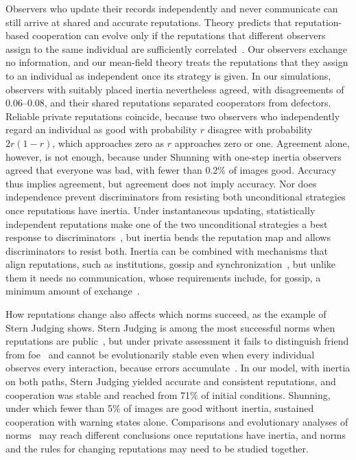 \documentclass[10pt]{wlscirep}
\theoremstyle{plain}
\theoremstyle{remark}
\begin{document}
Observers who update their records independently and never communicate can still arrive at shared and accurate reputations. Theory predicts that reputation-based cooperation can evolve only if the reputations that different observers assign to the same individual are sufficiently correlated~\cite{murase2024synchronization,tham2026}. Our observers exchange no information, and our mean-field theory treats the reputations that they assign to an individual as independent once its strategy is given. In our simulations, observers with suitably placed inertia nevertheless agreed, with disagreements of 0.06--0.08, and their shared reputations separated cooperators from defectors. Reliable private reputations coincide, because two observers who independently regard an individual as good with probability $r$ disagree with probability $2r(1-r)$, which approaches zero as $r$ approaches zero or one. Agreement alone, however, is not enough, because under Shunning with one-step inertia observers agreed that everyone was bad, with fewer than 0.2\% of images good. Accuracy thus implies agreement, but agreement does not imply accuracy. Nor does independence prevent discriminators from resisting both unconditional strategies once reputations have inertia. Under instantaneous updating, statistically independent reputations make one of the two unconditional strategies a best response to discriminators~\cite{murase2024synchronization}, but inertia bends the reputation map and allows discriminators to resist both. Inertia can be combined with mechanisms that align reputations, such as institutions, gossip and synchronization~\cite{radzvilavicius2021,kawakatsu2024,murase2024synchronization}, but unlike them it needs no communication, whose requirements include, for gossip, a minimum amount of exchange~\cite{kawakatsu2024}.

How reputations change also affects which norms succeed, as the example of Stern Judging shows. Stern Judging is among the most successful norms when reputations are public~\cite{santos2018}, but under private assessment it fails to distinguish friend from foe~\cite{hilbe2018} and cannot be evolutionarily stable even when every individual observes every interaction, because errors accumulate~\cite{fujimoto2023}. In our model, with inertia on both paths, Stern Judging yielded accurate and consistent reputations, and cooperation was stable and reached from 71\% of initial conditions. Shunning, under which fewer than 5\% of images are good without inertia, sustained cooperation with warning states alone. Comparisons and evolutionary analyses of norms~\cite{kessinger2023,murase2024computational} may reach different conclusions once reputations have inertia, and norms and the rules for changing reputations may need to be studied together.
\end{document}
